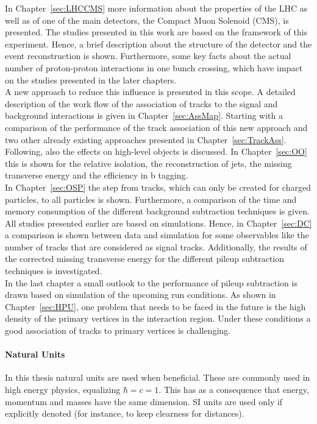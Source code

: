 In Chapter~\ref{sec:LHCCMS} more information about the properties of the LHC as well as of one of the main detectors, the Compact Muon Solenoid (CMS), is presented. The studies presented in this work are based on the framework of this experiment. Hence, a brief description about the structure of the detector and the event reconstruction is shown. Furthermore, some key facts about the actual number of proton-proton interactions in one bunch crossing, which have impact on the studies presented in the later chapters. \\
A new approach to reduce this influence is presented in this scope. A detailed description of the work flow of the association of tracks to the signal and background interactions is given in Chapter~\ref{sec:AssMap}. Starting with a comparison of the performance of the track association of this new approach and two other already existing approaches presented in Chapter~\ref{sec:TrackAss}. Following, also the effects on high-level objects is discussed. In Chapter~\ref{sec:OO} this is shown for the relative isolation, the reconstruction of jets, the missing transverse energy and the efficiency in b tagging. \\
In Chapter~\ref{sec:OSP} the step from tracks, which can only be created for charged particles, to all particles is shown. Furthermore, a comparison of the time and memory consumption of the different background subtraction techniques is given. \\
All studies presented earlier are based on simulations. Hence, in Chapter~\ref{sec:DC} a comparison is shown between data and simulation for some observables like the number of tracks that are considered as signal tracks. Additionally, the results of the corrected missing transverse energy for the different pileup subtraction techniques is investigated. \\
In the last chapter a small outlook to the performance of pileup subtraction is drawn based on simulation of the upcoming run conditions. As shown in Chapter~\ref{sec:HPU}, one problem that needs to be faced in the future is the high density of the primary vertices in the interaction region. Under these conditions a good association of tracks to primary vertices is challenging.

\paragraph*{Natural Units}

In this thesis natural units are used when beneficial. These are commonly used in high energy physics, equalizing $\hbar{} = c = 1$. This has as a consequence that energy, momentum and masses have the same dimension. SI units are used only if explicitly denoted (for instance, to keep clearness for distances).

